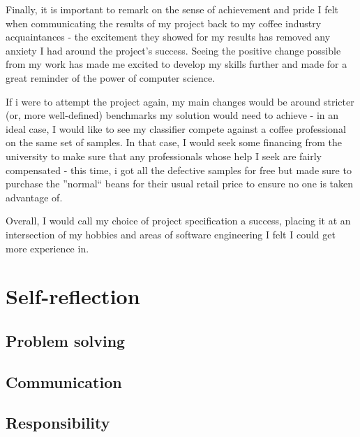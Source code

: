 \documentclass[12pt]{article}
\begin{document}
    Finally, it is important to remark on the sense of achievement and pride I felt when communicating the results of my project back to my
    coffee industry acquaintances - the excitement they showed for my results has removed any anxiety I had around the project's success.
    Seeing the positive change possible from my work has made me excited to develop my skills further and made for a great reminder of the power of computer science.

    If i were to attempt the project again, my main changes would be around stricter (or, more well-defined) benchmarks my solution would need to achieve -
    in an ideal case, I would like to see my classifier compete against a coffee professional on the same set of samples.
    In that case, I would seek some financing from the university to make sure that any professionals whose help I seek are fairly compensated -
    this time, i got all the defective samples for free but made sure to purchase the ''normal`` beans for their usual retail price to ensure no one is taken advantage of.

    Overall, I would call my choice of project specification a success, placing it at an intersection of my hobbies and areas of software engineering I felt I could get more experience in.


    \section{Self-reflection}
    \label{sec:section-2}

    \subsection{Problem solving}
    \label{subsec:problem-solving}

    \subsection{Communication}
    \label{subsec:communication}

    \subsection{Responsibility}
    \label{subsec:responsibility}
\end{document}
